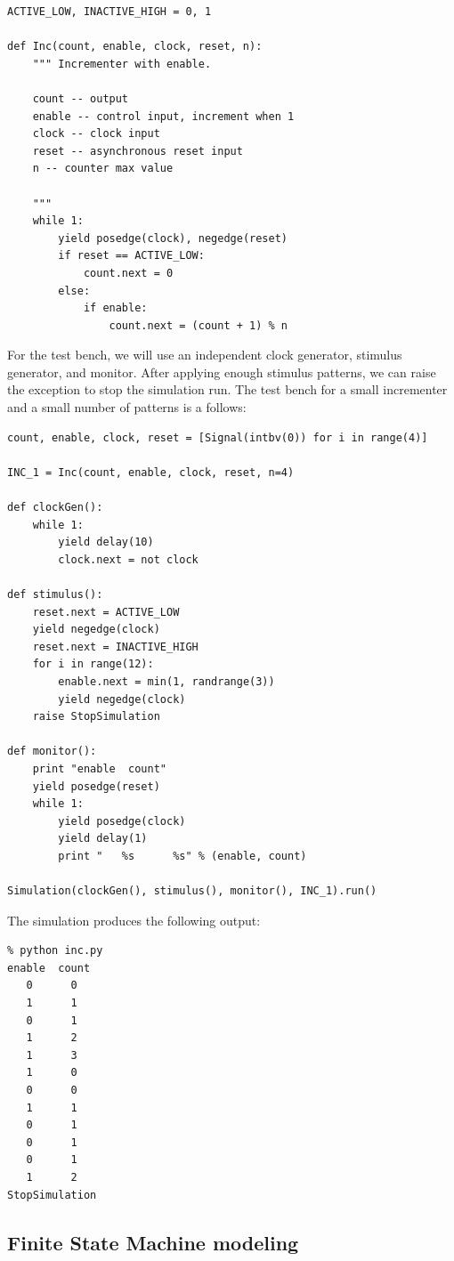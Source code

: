\begin{verbatim}
ACTIVE_LOW, INACTIVE_HIGH = 0, 1

def Inc(count, enable, clock, reset, n):
    """ Incrementer with enable.
    
    count -- output
    enable -- control input, increment when 1
    clock -- clock input
    reset -- asynchronous reset input
    n -- counter max value

    """
    while 1:
        yield posedge(clock), negedge(reset)
        if reset == ACTIVE_LOW:
            count.next = 0
        else:
            if enable:
                count.next = (count + 1) % n
\end{verbatim}

For the test bench, we will use an independent clock generator, stimulus
generator, and monitor. After applying enough stimulus patterns, we
can raise the  exception to stop the
simulation run. The test bench for a small incrementer and a small
number of patterns is a follows:

\begin{verbatim}
count, enable, clock, reset = [Signal(intbv(0)) for i in range(4)]

INC_1 = Inc(count, enable, clock, reset, n=4)

def clockGen():
    while 1:
        yield delay(10)
        clock.next = not clock

def stimulus():
    reset.next = ACTIVE_LOW
    yield negedge(clock)
    reset.next = INACTIVE_HIGH
    for i in range(12):
        enable.next = min(1, randrange(3))
        yield negedge(clock)
    raise StopSimulation

def monitor():
    print "enable  count"
    yield posedge(reset)
    while 1:
        yield posedge(clock)
        yield delay(1)
        print "   %s      %s" % (enable, count)
        
Simulation(clockGen(), stimulus(), monitor(), INC_1).run()
\end{verbatim}

The simulation produces the following output:
\begin{verbatim}
% python inc.py
enable  count
   0      0
   1      1
   0      1
   1      2
   1      3
   1      0
   0      0
   1      1
   0      1
   0      1
   0      1
   1      2
StopSimulation
\end{verbatim}


\subsection{Finite State Machine modeling \label{model-fsm}}

